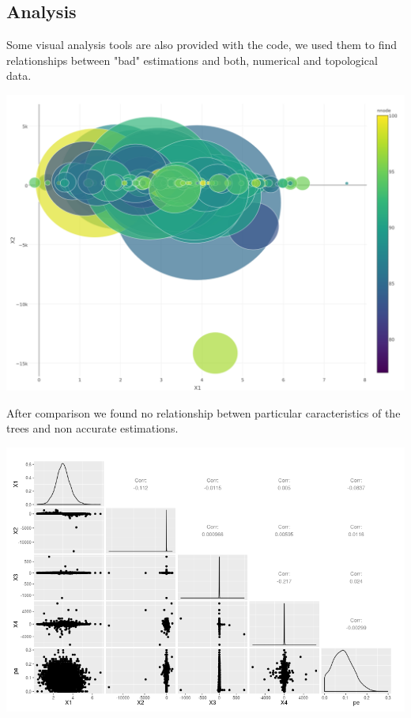 \documentclass[11pt]{article} %
\begin{document}
\subsection{Analysis}

Some visual analysis tools are also provided with the code, we used them to find relationships between "bad" estimations and both, numerical and topological data. 

\includegraphics[scale=0.3]{vis.png}

After comparison we found no relationship betwen particular caracteristics of the trees and non accurate estimations.

\includegraphics[scale=0.5]{pairs}
\end{document}

